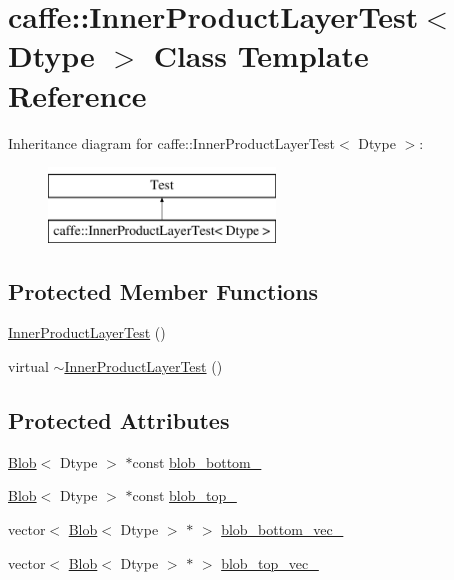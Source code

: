 \hypertarget{classcaffe_1_1_inner_product_layer_test}{\section{caffe\+:\+:Inner\+Product\+Layer\+Test$<$ Dtype $>$ Class Template Reference}
\label{classcaffe_1_1_inner_product_layer_test}
}
Inheritance diagram for caffe\+:\+:Inner\+Product\+Layer\+Test$<$ Dtype $>$\+:\begin{figure}[H]
\begin{center}
\leavevmode
\includegraphics[height=2.000000cm]{classcaffe_1_1_inner_product_layer_test}
\end{center}
\end{figure}
\subsection*{Protected Member Functions}
\begin{DoxyCompactItemize}
\item 
\hyperlink{classcaffe_1_1_inner_product_layer_test_a96449bd1edf94bf783c3de331e967f9f}{Inner\+Product\+Layer\+Test} ()
\item 
virtual \hyperlink{classcaffe_1_1_inner_product_layer_test_a6755035389ffdf024d08e73bc870be60}{$\sim$\+Inner\+Product\+Layer\+Test} ()
\end{DoxyCompactItemize}
\subsection*{Protected Attributes}
\begin{DoxyCompactItemize}
\item 
\hyperlink{classcaffe_1_1_blob}{Blob}$<$ Dtype $>$ $\ast$const \hyperlink{classcaffe_1_1_inner_product_layer_test_adfa9bbdc3882fe32e7f73a776cf9baba}{blob\+\_\+bottom\+\_\+}
\item 
\hyperlink{classcaffe_1_1_blob}{Blob}$<$ Dtype $>$ $\ast$const \hyperlink{classcaffe_1_1_inner_product_layer_test_aba9a6f499c414653250a4cb9e81e0e70}{blob\+\_\+top\+\_\+}
\item 
vector$<$ \hyperlink{classcaffe_1_1_blob}{Blob}$<$ Dtype $>$ $\ast$ $>$ \hyperlink{classcaffe_1_1_inner_product_layer_test_acf2d5e26939568693b5fe360ce630d84}{blob\+\_\+bottom\+\_\+vec\+\_\+}
\item 
vector$<$ \hyperlink{classcaffe_1_1_blob}{Blob}$<$ Dtype $>$ $\ast$ $>$ \hyperlink{classcaffe_1_1_inner_product_layer_test_ac403f0c52fd366423da30010391c270e}{blob\+\_\+top\+\_\+vec\+\_\+}
\end{DoxyCompactItemize}


